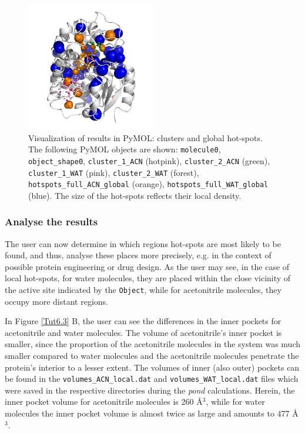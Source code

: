 \documentclass[9pt,tutorial]{livecoms}
\begin{document}
\begin{figure}[ht!]
\centering
\includegraphics[width=0.5\textwidth]{Tut6.4.png}
\caption{Visualization of results in PyMOL: clusters and global hot-spots. The following PyMOL objects are shown: \texttt{molecule0}, \texttt{object\_shape0}, \texttt{cluster\_1\_ACN} (hotpink), \texttt{cluster\_2\_ACN} (green), \texttt{cluster\_1\_WAT} (pink), \texttt{cluster\_2\_WAT} (forest), \texttt{hotspots\_full\_ACN\_global} (orange), \texttt{hotspots\_full\_WAT\_global} (blue). The size of the hot-spots reflects their local density.}
\label{Tut6.4}
\end{figure}

\subsubsection{Analyse the results}
The user can now determine in which regions hot-spots are most likely to be found, and thus, analyse these places more precisely, e.g. in the context of possible protein engineering or drug design. As the user may see, in the case of local hot-spots, for water molecules, they are placed within the close vicinity of the active site indicated by the \texttt{Object}, while for acetonitrile molecules, they occupy more distant regions.

In Figure \ref{Tut6.3} B, the user can see the differences in the inner pockets for acetonitrile and water molecules. The volume of acetonitrile's inner pocket is smaller, since the proportion of the acetonitrile molecules in the system was much smaller compared to water molecules and the acetonitrile molecules penetrate the protein's interior to a lesser extent. The volumes of inner (also outer) pockets can be found in the \texttt{volumes\_ACN\_local.dat} and \texttt{volumes\_WAT\_local.dat} files which were saved in the respective directories during the \emph{pond} calculations. Herein, the inner pocket volume for acetonitrile molecules is 260 Å\( \displaystyle ^{3}\), while for water molecules the inner pocket volume is almost twice as large and amounts to 477 Å\( \displaystyle ^{3}\).
\end{document}
